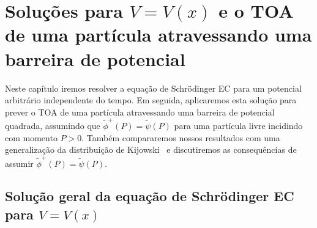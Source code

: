 

\chapter{Soluções para $V=V(x)$ e o TOA de uma partícula atravessando uma barreira de potencial}
\label{chap:cap4}

Neste capítulo iremos resolver a equação de Schrödinger EC para um potencial arbitrário independente do tempo. Em seguida, aplicaremos esta solução para prever o TOA de uma partícula atravessando uma barreira de potencial quadrada, assumindo que ${\tilde \phi}^+(P)={\tilde \psi}(P)$ para uma partícula livre incidindo com momento $P>0$. Também compararemos nossos resultados com uma generalização da distribuição de Kijowski~\cite{Delgado,Leon,Baute2} e discutiremos as consequências de assumir ${\tilde \phi}^+(P)={\tilde \psi}(P)$.

\section{Solução geral da equação de Schrödinger EC para $V = V(x)$}
\label{sec:solVarb}

